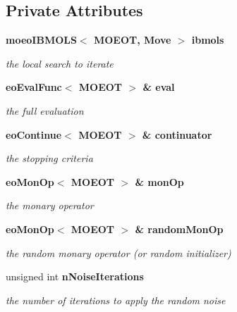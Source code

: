 \subsection*{Private Attributes}
\begin{CompactItemize}
\item 
\bf{moeo\-IBMOLS}$<$ MOEOT, Move $>$ \bf{ibmols}\label{classmoeoIteratedIBMOLS_6b1351f1faa391a1f095d1f9d4dba915}

\begin{CompactList}\small\item\em the local search to iterate \item\end{CompactList}\item 
\bf{eo\-Eval\-Func}$<$ MOEOT $>$ \& \bf{eval}\label{classmoeoIteratedIBMOLS_7abdd0c1433ec4671522c8d5edc9fe61}

\begin{CompactList}\small\item\em the full evaluation \item\end{CompactList}\item 
\bf{eo\-Continue}$<$ MOEOT $>$ \& \bf{continuator}\label{classmoeoIteratedIBMOLS_964e5df65c7aa33dd84eed3180d5e0a3}

\begin{CompactList}\small\item\em the stopping criteria \item\end{CompactList}\item 
\bf{eo\-Mon\-Op}$<$ MOEOT $>$ \& \bf{mon\-Op}\label{classmoeoIteratedIBMOLS_77851daa2f2230000c0012beef3b8558}

\begin{CompactList}\small\item\em the monary operator \item\end{CompactList}\item 
\bf{eo\-Mon\-Op}$<$ MOEOT $>$ \& \bf{random\-Mon\-Op}\label{classmoeoIteratedIBMOLS_89df3bfa7069c06c7e7cf4b30ccc5535}

\begin{CompactList}\small\item\em the random monary operator (or random initializer) \item\end{CompactList}\item 
unsigned int \bf{n\-Noise\-Iterations}\label{classmoeoIteratedIBMOLS_a50f25daf2847fb9d299ef65baf3bda7}

\begin{CompactList}\small\item\em the number of iterations to apply the random noise \item\end{CompactList}\end{CompactItemize}


